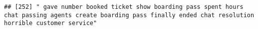 \documentclass[
]{article}
\begin{document}
\begin{verbatim}
## [252] " gave number booked ticket show boarding pass spent hours chat passing agents create boarding pass finally ended chat resolution horrible customer service"                                                                                                                                                                                                                                                                                                                                                                                                                                                                                                                                                                                                                                                                                                                                                                                                                                                                                                                                                                                                                                                                                                                                                                                                                                                                                                                                                                                                                                                                                                                                                                                                                                    

\end{verbatim}
\end{document}
